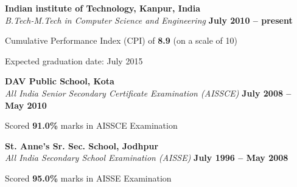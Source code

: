 \documentclass[margin,line]{resume}
\begin{document}
\begin{resume}
  \textbf{Indian institute of Technology, Kanpur, India} \vspace{2mm}\\\vspace{1mm}%
  \textsl{B.Tech-M.Tech in Computer Science and Engineering} \hfill \textbf{ July 2010 -- present}\vspace{-3mm}\\\vspace{-1mm}%
  \begin{list2}
  \item Cumulative Performance Index (CPI) of \textbf{\textsf{8.9}} (on a scale of 10)
  \item Expected graduation date: July 2015
  \end{list2}\vspace{-1.5mm}
  \textbf{DAV Public School, Kota} \vspace{2mm}\\\vspace{1mm}%
  \textsl{All India Senior Secondary Certificate Examination (AISSCE)} \hfill \textbf{ July 2008 -- May 2010}\vspace{-3mm}\\\vspace{-1mm}%
  \begin{list2}
  \item Scored \textbf{\textsf{91.0\%}} marks in AISSCE Examination
  \end{list2}
  \textbf{St. Anne's Sr. Sec. School, Jodhpur} \vspace{2mm}\\\vspace{1mm}%
  \textsl{All India Secondary School Examination (AISSE)} \hfill \textbf{ July 1996 -- May 2008}\vspace{-3mm}\\\vspace{-1mm}%
  \begin{list2}
  \item Scored \textbf{\textsf {95.0\%}} marks in AISSE Examination
  \end{list2}
  \vspace{-1mm}%



\end{resume}
\end{document}

